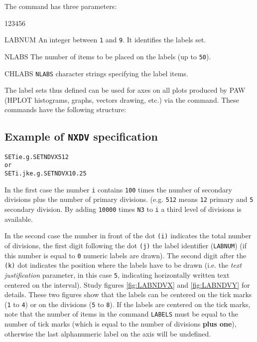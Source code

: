The  command has three parameters:
\begin{DLtt}{123456}
\item[LABNUM] An integer between \texttt{1} and \texttt{9}.
              It identifies the labels set.
\item[NLABS]  The number of items to be placed on the labels 
              (up to \texttt{50}).
\item[CHLABS] \texttt{NLABS} character strings specifying the label items.
\end{DLtt}

The label sets thus defined can be used for axes on all plots produced
by PAW (HPLOT histograms, graphs, vectors drawing, etc.) via the
 command.
These commands have the following structure:

\subsection*{Example of \texttt{NXDV} specification}
\begin{alltt}
    SET  i            e.g. SET NDVX 512
{\rm or}
    SET  i.jk         e.g. SET NDVX 10.25
\end{alltt}

In the first case the number \texttt{i} contains
\texttt{100} times the 
number of secondary divisions plus the number of primary divisions.
(e.g. \texttt{512} means \texttt{12} primary and \texttt{5} secondary division. 
By adding \texttt{10000} times \texttt{N3} to \texttt{i} a third level of divisions
is available.

In the second case the number in front of the dot \texttt{(i)} indicates the total
number of divisions, the first digit following the dot \texttt{(j)} the label
identifier (\texttt{LABNUM}) (if this number is equal to \texttt{0} numeric labels
are drawn). The second digit after the \texttt{(k)} dot indicates the position 
where the  labels have to be drawn (i.e. the
{\em text justification} parameter, in this case \texttt{5}, indicating 
horizontally written text centered on the interval). Study figures 
\ref{fig:LABNDVX} and \ref{fig:LABNDVY} for details. These two figures show 
that the labels can be centered on the tick marks (\texttt{1} to \texttt{4}) or on 
the divisions (\texttt{5} to \texttt{8}). If the labels are centered on the tick 
marks, note that the number of items in the command \texttt{LABELS} must be equal
to the number of tick marks (which is equal to the number of divisions 
{\bf plus one}), otherwise the last alphanumeric label on the axis will be 
undefined. 

